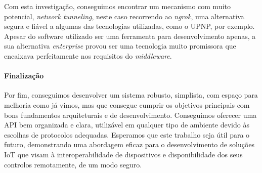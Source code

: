 Com esta investigação, conseguimos encontrar um mecanismo com muito potencial, \textit{network tunneling}, neste caso recorrendo ao \textit{ngrok}, uma alternativa segura e fiável a algumas das tecnologias utilizadas, como o UPNP, por exemplo. Apesar do software utilizado ser uma ferramenta para desenvolvimento apenas, a sua alternativa \textit{enterprise} provou ser uma tecnologia muito promissora que encaixava perfeitamente nos requisitos do \textit{middleware}.

\paragraph*{Finalização}

Por fim, conseguimos desenvolver um sistema robusto, simplista, com espaço para melhoria como já vimos, mas que consegue cumprir os objetivos principais com bons fundamentos arquiteturais e de desenvolvimento. Conseguimos oferecer uma API bem organizada e clara, utilizável em qualquer tipo de ambiente devido às escolhas de protocolos adequadas. Esperamos que este trabalho seja útil para o futuro, demonstrando uma abordagem eficaz para o desenvolvimento de soluções IoT que visam à interoperabilidade de dispositivos e disponibilidade dos seus controlos remotamente, de um modo seguro.

